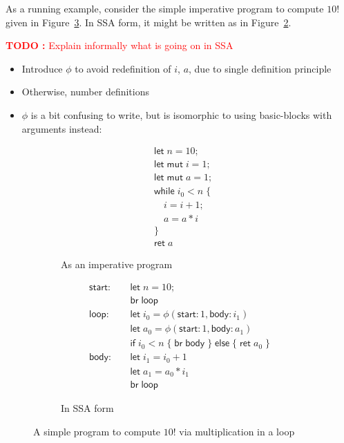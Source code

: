 \documentclass[acmsmall,screen,review]{acmart}
\newcounter{todos}
\newcommand{\TODO}[1]{{
  \stepcounter{todos}
  \begin{center}\large{\textcolor{red}{\textbf{TODO \arabic{todos}:} #1}}\end{center}
}}
\newcommand{\ms}[1]{\ensuremath{\mathsf{#1}}}
\begin{document}
As a running example, consider the simple imperative program to compute $10!$ given in
Figure~\ref{fig:ten-fact-program}. In SSA form, it might be written as in
Figure~\ref{fig:ten-fact-ssa}.

\TODO{Explain informally what is going on in SSA}
\begin{itemize}
  \item Introduce $\phi$ to avoid redefinition of $i$, $a$, due to single definition principle
  \item Otherwise, number definitions
  \item $\phi$ is a bit confusing to write, but is isomorphic to using basic-blocks with arguments
  instead:
\end{itemize}

\begin{figure}
  \begin{subfigure}[t]{.5\textwidth}
    \begin{align*}
      & \ms{let}\;n = 10; \\
      & \ms{let\;mut}\;i = 1; \\
      & \ms{let\;mut}\;a = 1; \\
      & \ms{while}\;i_0 < n\;\{ \\
      & \quad i = i + 1; \\
      & \quad a = a * i \\
      & \} \\
      & \ms{ret}\;a
    \end{align*}
    \caption{As an imperative program}
    \label{fig:ten-fact-program-imp}
  \end{subfigure}%
  \begin{subfigure}[t]{.5\textwidth}
    \begin{align*}
      \ms{start}:\quad & \ms{let}\;n = 10; \\
      & \ms{br}\;\ms{loop} \\
      \ms{loop}: \quad  & \ms{let}\;i_0 = \phi(\ms{start}: 1, \ms{body}: i_1) \\
                        & \ms{let}\;a_0 = \phi(\ms{start}: 1, \ms{body}: a_1) \\
                        & \ms{if}\;i_0 < n\;
                          \{\;\ms{br}\;\ms{body}\;\}\;
                          \ms{else}\;\{\;\ms{ret}\;a_0\;\} \\
      \ms{body}: \quad  & \ms{let}\;i_1 = i_0 + 1 \\
                        & \ms{let}\;a_1 = a_0 * i_1 \\
                        & \ms{br}\;\ms{loop}
    \end{align*}
    \caption{In SSA form}
    \label{fig:ten-fact-ssa}
  \end{subfigure}
  \caption{
    A simple program to compute $10!$ via multiplication in a loop
  }
  \Description{}
  \label{fig:ten-fact-program}
\end{figure}
\end{document}
